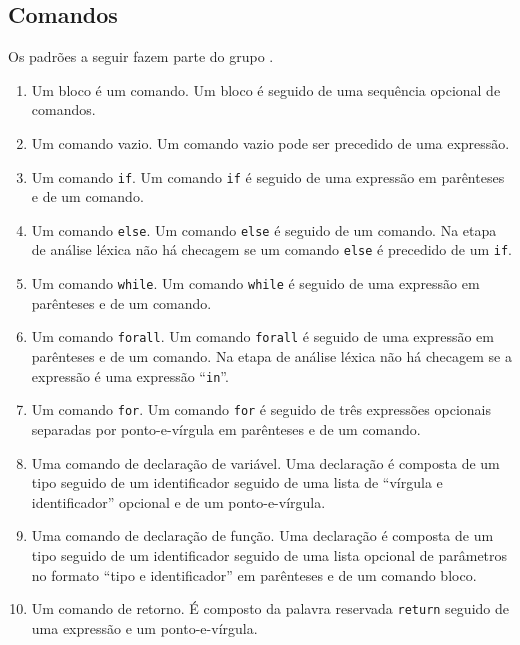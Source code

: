 \documentclass{llncs}
\begin{document}
\subsection{Comandos}
Os padrões a seguir fazem parte do grupo .
\begin{enumerate}
	\item {}

		Um bloco é um comando. Um bloco é seguido de uma sequência opcional de comandos.
	\item {}

		Um comando vazio. Um comando vazio pode ser precedido de uma expressão.
	\item {}

		Um comando \texttt{if}. Um comando \texttt{if} é seguido de uma expressão em parênteses e de um comando.
	\item {}

		Um comando \texttt{else}. Um comando \texttt{else} é seguido de um comando. Na etapa de análise léxica não há checagem se um comando \texttt{else} é precedido de um \texttt{if}.
	\item {}

		Um comando \texttt{while}. Um comando \texttt{while} é seguido de uma expressão em parênteses e de um comando.
	\item {}

		Um comando \texttt{forall}. Um comando \texttt{forall} é seguido de uma expressão em parênteses e de um comando. Na etapa de análise léxica não há checagem se a expressão é uma expressão ``\texttt{in}''.
	\item {}

		Um comando \texttt{for}. Um comando \texttt{for} é seguido de três expressões opcionais separadas por ponto-e-vírgula em parênteses e de um comando.
	\item {}

		Uma comando de declaração de variável. Uma declaração é composta de um tipo seguido de um identificador seguido de uma lista de ``vírgula e identificador'' opcional e de um ponto-e-vírgula.
	\item {}

		Uma comando de declaração de função. Uma declaração é composta de um tipo seguido de um identificador seguido de uma lista opcional de parâmetros no formato ``tipo e identificador'' em parênteses e de um comando bloco.
	\item {}

		Um comando de retorno. É composto da palavra reservada \texttt{return} seguido de uma expressão e um ponto-e-vírgula.
\end{enumerate}
\end{document}
